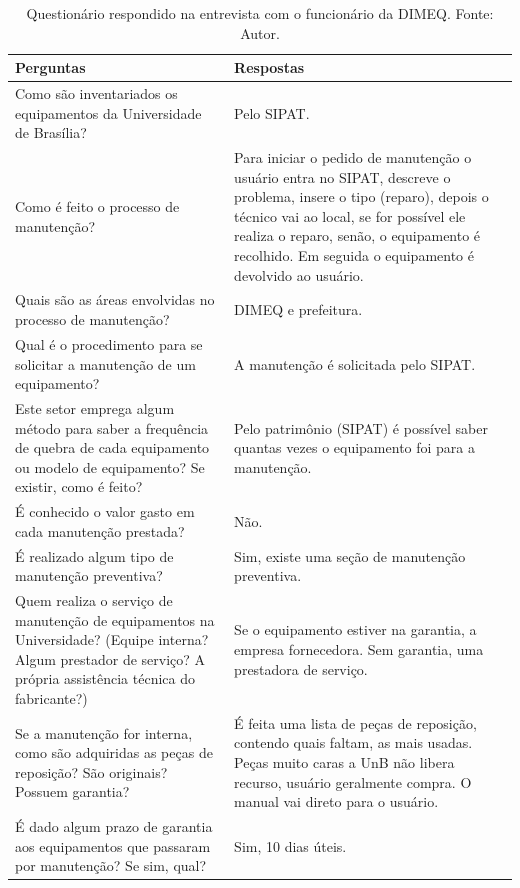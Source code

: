 \begin{table}[H]
\centering
\caption{Questionário respondido na entrevista com o funcionário da DIMEQ. Fonte: Autor.}
\label{questionario}
\begin{tabular}{ |p{7cm}| p{8cm} |}
\hline
	Perguntas & Respostas \\ \hline
	Como são inventariados os equipamentos da Universidade de Brasília? & Pelo SIPAT. \\ \hline
	Como é feito o processo de manutenção? & Para iniciar o pedido de manutenção o usuário entra no SIPAT, descreve o problema, insere o tipo (reparo), depois o técnico vai ao local, se for possível ele realiza o reparo, senão, o equipamento é recolhido. Em seguida o equipamento é devolvido ao usuário. \\ \hline
	Quais são as áreas envolvidas no processo de manutenção? & DIMEQ e prefeitura. \\ \hline
	Qual é o procedimento para se solicitar a manutenção de um equipamento? & A manutenção é solicitada pelo SIPAT. \\ \hline
	Este setor emprega algum método para saber a frequência de quebra de cada equipamento ou modelo de equipamento? Se existir, como é feito? & Pelo patrimônio (SIPAT) é possível saber quantas vezes o equipamento foi para a manutenção. \\ \hline
	É conhecido o valor gasto em cada manutenção prestada? & Não. \\ \hline
	É realizado algum tipo de manutenção preventiva? & Sim, existe uma seção de manutenção preventiva. \\ \hline
	Quem realiza o serviço de manutenção de equipamentos na Universidade? (Equipe interna? Algum prestador de serviço? A própria assistência técnica do fabricante?) & Se o equipamento estiver na garantia, a empresa fornecedora. Sem garantia, uma prestadora de serviço. \\ \hline
	Se a manutenção for interna, como são adquiridas as peças de reposição? São originais? Possuem garantia? & É feita uma lista de peças de reposição, contendo quais faltam, as mais usadas. Peças muito caras a UnB não libera recurso, usuário geralmente compra. O manual vai direto para o usuário. \\ \hline
	É dado algum prazo de garantia aos equipamentos que passaram por manutenção? Se sim, qual? & Sim, 10 dias úteis.\\ \hline
\end{tabular}
\end{table}


